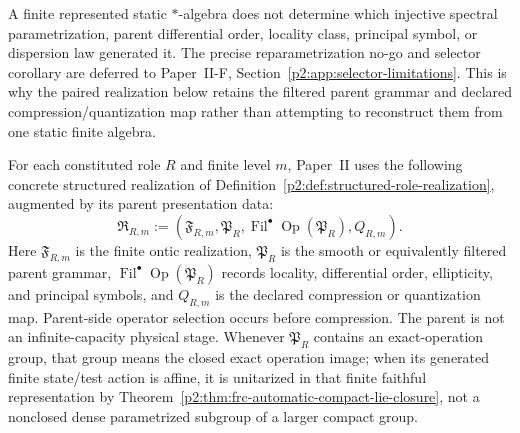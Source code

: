 \documentclass[12pt,a4paper]{article}
\begin{document}
\begin{remark}
\label{p2:rem:static-algebra-scope-guard}
A finite represented static \(*\)-algebra does not determine which injective
spectral parametrization, parent differential order, locality class, principal
symbol, or dispersion law generated it.  The precise reparametrization no-go
and selector corollary are deferred to
Paper~II-F, Section~\ref{p2:app:selector-limitations}.  This is why the paired realization
below retains the filtered parent grammar and declared compression/quantization
map rather than attempting to reconstruct them from one static finite algebra.
\end{remark}

\begin{definition}
\label{p2:def:paired-realization}
For each constituted role \(R\) and finite level \(m\), Paper~II uses the
following concrete structured realization of
Definition~\ref{p2:def:structured-role-realization}, augmented by its parent
presentation data:
\[
 \mathfrak R_{R,m}
 :=\left(
     \mathfrak F_{R,m},
     \mathfrak P_R,
     \operatorname{Fil}^{\bullet}\operatorname{Op}(\mathfrak P_R),
     Q_{R,m}
   \right).
\]
Here \(\mathfrak F_{R,m}\) is the finite ontic realization,
\(\mathfrak P_R\) is the smooth or equivalently filtered parent grammar,
\(\operatorname{Fil}^{\bullet}\operatorname{Op}(\mathfrak P_R)\) records
locality, differential order, ellipticity, and principal symbols, and
\(Q_{R,m}\) is the declared compression or quantization map.  Parent-side
operator selection occurs before compression.  The parent is not an
infinite-capacity physical stage.  Whenever \(\mathfrak P_R\) contains an
exact-operation group, that group means the closed exact operation image;
when its generated finite state/test action is affine, it is unitarized in
that finite faithful representation by
Theorem~\ref{p2:thm:frc-automatic-compact-lie-closure}, not a
nonclosed dense parametrized subgroup of a larger compact group.
\end{definition}
\end{document}
